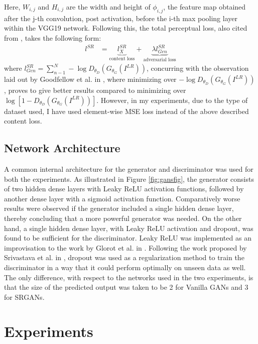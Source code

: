 \documentclass[10pt,journal,compsoc]{IEEEtran}
\begin{document}
Here, $W_{i,j}$ and $H_{i,j}$ are the width and height of $\phi_{i,j}$, the feature map obtained after the j-th convolution, post activation, before the i-th max pooling layer within the VGG19 network.  Following this, the total perceptual loss, also cited from \cite{ledig2017photo}, takes the following form:
\begin{align}
\label{eq4}
l^{SR}& = \underbrace{l_{X}^{SR}}_\text{content loss} + \underbrace{\lambda l_{Gen}^{SR}}_\text{adversarial loss}
\end{align}
where \(l_{Gen}^{SR} = \sum_{n-1}^{N} -\log D_{\theta_{D}}(G_{\theta_{G}}(I^{LR}))\), concurring with the observation laid out by Goodfellow et al. in \cite{vanillagans}, where minimizing over \(-\log D_{\theta_{D}}(G_{\theta_{G}}(I^{LR}))\), proves to give better results compared to minimizing over \(\log[1- D_{\theta_{D}}(G_{\theta_{G}}(I^{LR}))]\). However, in my experiments, due to the type of dataset used, I have used element-wise MSE loss instead of the above described content loss.

\subsection{Network Architecture}
A common internal architecture for the generator and discriminator was used for both the experiments. As illustrated in Figure \ref{fig:gansfig}, the generator consists of two hidden dense layers with Leaky ReLU activation functions, followed by another dense layer with a sigmoid activation function. Comparatively worse results were observed if the generator included a single hidden dense layer, thereby concluding that a more powerful generator was needed. On the other hand, a single hidden dense layer, with Leaky ReLU activation and dropout, was found to be sufficient for the discriminator. Leaky ReLU was implemented as an improvisation to the work by Glorot et al. in \cite{glorot2011deep}. Following the work proposed by Srivastava et al. in \cite{srivastava2014dropout}, dropout was used as a regularization method to train the discriminator in a way that it could perform optimally on unseen data as well. The only difference, with respect to the networks used in the two experiments, is that the size of the predicted output was taken to be 2 for Vanilla GANs and 3 for SRGANs.

\section{Experiments}
\end{document}
